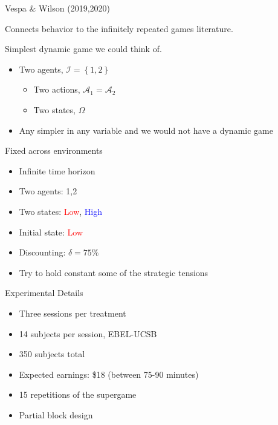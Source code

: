 \documentclass{beamer}
\begin{document}
\begin{frame}{Vespa \& Wilson (2019,2020) }
\begin{card}
Connects behavior to the infinitely repeated
games literature.
\end{card}
\begin{card}
Simplest dynamic game we could think of.

\begin{itemize}
\item Two agents, $\mathcal{I}=\left\{ 1,2\right\} $

\begin{itemize}
\item Two actions, $\mathcal{A}_{1}=\mathcal{A}_{2}$
\item Two states, $\Omega$ \pause
\end{itemize}
\item Any simpler in any variable and we would not have a dynamic game
\end{itemize}
\end{card}
\end{frame}


\begin{frame}{Fixed across environments}
    \begin{card}
    \begin{itemize}
    \item Infinite time horizon
    \item Two agents: 1,2
    \item Two states: \textcolor{red}{Low}, \textcolor{blue}{High}
    \item Initial state: \textcolor{red}{Low}
    \item Discounting: $\delta=75\%$\pause
    \item Try to hold constant some of the strategic tensions
    \end{itemize}
    \end{card}
\end{frame}

\begin{frame}

    \begin{card}{Experimental Details}
    \begin{itemize}
    \item Three sessions per treatment
    \item 14 subjects per session, EBEL-UCSB
    \item 350 subjects total
    \item Expected earnings: \$18 (between 75-90 minutes)
    \item 15 repetitions of the supergame
    \item Partial block design
    \end{itemize}
    \end{card}
\end{frame}
\end{document}
